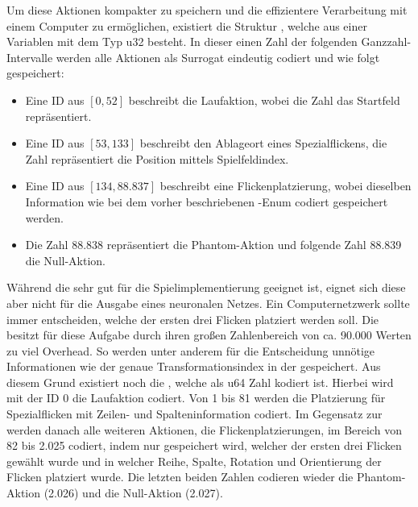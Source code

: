 

Um diese Aktionen kompakter zu speichern und die effizientere Verarbeitung mit einem Computer zu ermöglichen, existiert die Struktur , welche aus einer Variablen mit dem Typ \ac{u32} besteht. In dieser einen Zahl der folgenden Ganzzahl-Intervalle werden alle Aktionen als Surrogat eindeutig codiert und wie folgt gespeichert:

\begin{itemize}
    \item Eine \ac{ID} aus $[0, 52]$ beschreibt die Laufaktion, wobei die Zahl das Startfeld repräsentiert.
    \item Eine \ac{ID} aus $[53, 133]$ beschreibt den Ablageort eines Spezialflickens, die Zahl repräsentiert die Position mittels Spielfeldindex.
    \item Eine \ac{ID} aus $[134, 88.837]$ beschreibt eine Flickenplatzierung, wobei dieselben Information wie bei dem vorher beschriebenen -Enum codiert gespeichert werden.
    \item Die Zahl 88.838 repräsentiert die Phantom-Aktion und folgende Zahl 88.839 die Null-Aktion.
\end{itemize}

Während die \hyperref[text:action-id]{} sehr gut für die Spielimplementierung geeignet ist, eignet sich diese aber nicht für die Ausgabe eines neuronalen Netzes. Ein Computernetzwerk sollte immer entscheiden, welche der ersten drei Flicken platziert werden soll. Die \hyperref[text:action-id]{} besitzt für diese Aufgabe durch ihren großen Zahlenbereich von ca. 90.000 Werten zu viel Overhead. So werden unter anderem für die Entscheidung unnötige Informationen wie der genaue Transformationsindex in der \hyperref[text:action-id]{} gespeichert. Aus diesem Grund existiert noch die , welche als \ac{u64} Zahl kodiert ist. Hierbei wird mit der \ac{ID} 0 die Laufaktion codiert. Von 1 bis 81 werden die Platzierung für Spezialflicken mit Zeilen- und Spalteninformation codiert. Im Gegensatz zur \hyperref[text:action-id]{} werden danach alle weiteren Aktionen, die Flickenplatzierungen, im Bereich von 82 bis 2.025 codiert, indem nur gespeichert wird, welcher der ersten drei Flicken gewählt wurde und in welcher Reihe, Spalte, Rotation und Orientierung der Flicken platziert wurde. Die letzten beiden Zahlen codieren wieder die Phantom-Aktion (2.026) und die Null-Aktion (2.027).

